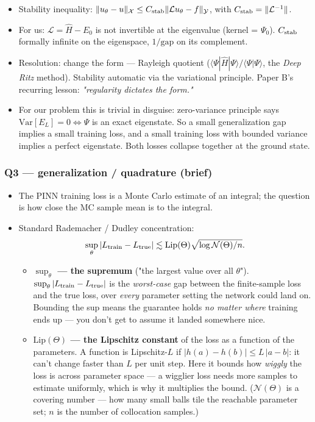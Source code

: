 \documentclass[11pt]{article}
\begin{document}
\begin{itemize}
\item Stability inequality: $\|u_\theta - u\|_{\mathcal X} \le C_{\rm stab}
  \|\mathcal L u_\theta - f\|_{\mathcal Y}$, with $C_{\rm stab} =
  \|\mathcal L^{-1}\|$.
\item For us: $\mathcal L = \hat H - E_0$ is not invertible at the eigenvalue
(kernel = $\Psi_0$). $C_{\rm stab}$ formally infinite on the eigenspace,
$1/\text{gap}$ on its complement.
\item Resolution: change the form --- Rayleigh quotient ($\langle \Psi | \hat H
  | \Psi \rangle / \langle \Psi | \Psi \rangle$, the \emph{Deep Ritz} method).
Stability automatic via the variational principle. Paper B's recurring
lesson: \emph{"regularity dictates the form."}
\item For our problem this is trivial in disguise: zero-variance principle says
$\mathrm{Var}[E_L] = 0 \iff \Psi$ is an exact eigenstate. So a small
generalization gap implies a small training loss, and a small training
loss with bounded variance implies a perfect eigenstate. Both losses
collapse together at the ground state.
\end{itemize}
\subsubsection*{Q3 --- generalization / quadrature (brief)}

\begin{itemize}
\item The PINN training loss is a Monte Carlo estimate of an integral; the
question is how close the MC sample mean is to the integral.
\item Standard Rademacher / Dudley concentration:
\[\sup_{\theta} |L_{\rm train} - L_{\rm true}| \lesssim \mathrm{Lip}
  (\Theta) \sqrt{\log \mathcal N(\Theta) / n}.\]
\begin{itemize}
\item \textbf{$\sup_\theta$ --- the supremum} ("the largest value over all
$\theta$"). $\sup_\theta|L_{\rm train}-L_{\rm true}|$ is the \emph{worst-case}
gap between the finite-sample loss and the true loss, over \emph{every}
parameter setting the network could land on. Bounding the sup means the
guarantee holds \emph{no matter where} training ends up --- you don't get to
assume it landed somewhere nice.
\item \textbf{$\mathrm{Lip}(\Theta)$ --- the Lipschitz constant} of the loss as a
function of the parameters. A function is Lipschitz-$L$ if
$|h(a)-h(b)| \le L\,|a-b|$: it can't change faster than $L$ per unit
step. Here it bounds how \emph{wiggly} the loss is across parameter space ---
a wigglier loss needs more samples to estimate uniformly, which is why
it multiplies the bound. ($\mathcal N(\Theta)$ is a covering number --- how
many small balls tile the reachable parameter set; $n$ is the number of
collocation samples.)
\end{itemize}
\end{itemize}
\end{document}
